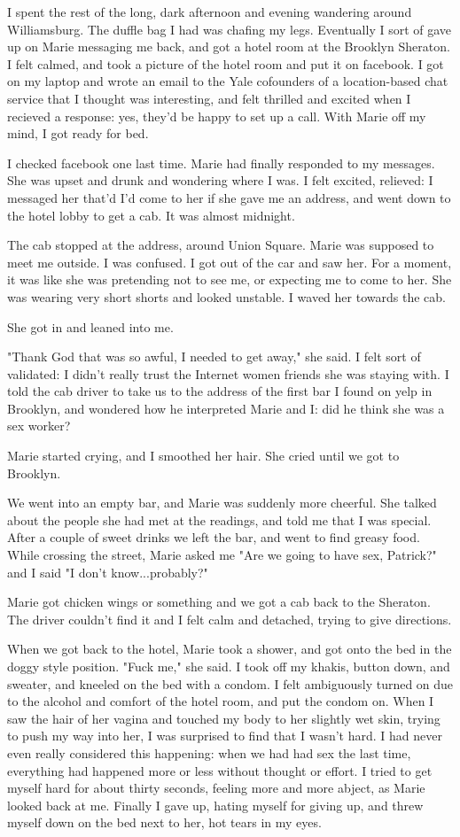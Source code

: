 \documentclass[12pt]{article}
\begin{document}
I spent the rest of the long, dark afternoon and evening wandering around
Williamsburg.  The duffle bag I had was chafing my legs.  Eventually I sort
of gave up on Marie messaging me back, and got a hotel room at the Brooklyn
Sheraton.  I felt calmed, and took a picture of the hotel room and put it on
facebook.  I got on my laptop and wrote an email to the Yale cofounders of a
location-based chat service that I thought was interesting, and felt thrilled
and excited when I recieved a response: yes, they'd be happy to set up a call.
With Marie off my mind, I got ready for bed.  

I checked facebook one last time.  Marie had finally responded to my messages.
She was upset and drunk and wondering where I was.  I felt excited, relieved: I
messaged her that'd I'd come to her if she gave me an address, and went down to
the hotel lobby to get a cab.  It was almost midnight.

The cab stopped at the address, around Union Square.  Marie was supposed to meet
me outside. I was confused.  I got out of the car and saw her.  For a moment, it
was like she was pretending not to see me, or expecting me to come to her.  She
was wearing very short shorts and looked unstable.  I waved her towards the cab.  

She got in and leaned into me.

"Thank God that was so awful, I needed to get away," she said.  I felt sort of
validated: I didn't really trust the Internet women friends she was staying
with.  I told the cab driver to take us to the address of the first bar I found
on yelp in Brooklyn, and wondered how he interpreted Marie and I: did he think
she was a sex worker?  

Marie started crying, and I smoothed her hair.  She cried until we got to
Brooklyn.

We went into an empty bar, and Marie was suddenly more cheerful.  She talked
about the people she had met at the readings, and told me that I was special.
After a couple of sweet drinks we left the bar, and went to find greasy food.
While crossing the street, Marie asked me "Are we going to have sex, Patrick?"
and I said "I don't know...probably?"  

Marie got chicken wings or something and we got a cab back to the Sheraton.  The
driver couldn't find it and I felt calm and detached, trying to give directions.  

When we got back to the hotel, Marie took a shower, and got onto the bed in the
doggy style position.  "Fuck me," she said.  I took off my khakis, button down,
and sweater, and kneeled on the bed with a condom.  I felt ambiguously turned on
due to the alcohol and comfort of the hotel room, and put the condom on.  When I
saw the hair of her vagina and touched my body to her slightly wet skin, trying
to push my way into her, I was surprised to find that I wasn't hard.  I had
never even really considered this happening: when we had had sex the last time,
everything had happened more or less without thought or effort.  I tried to get
myself hard for about thirty seconds, feeling more and more abject, as Marie
looked back at me.  Finally I gave up, hating myself for giving up, and threw
myself down on the bed next to her, hot tears in my eyes.
\end{document}
